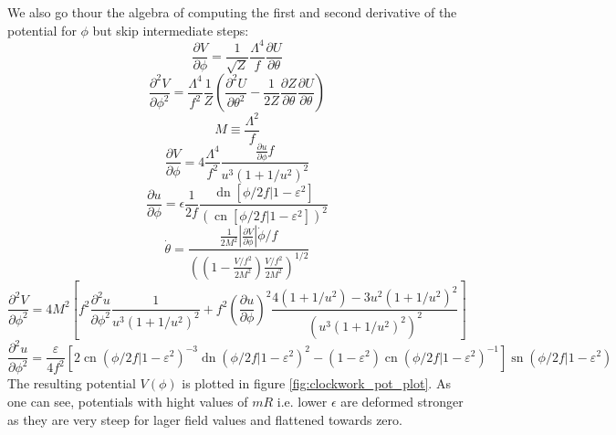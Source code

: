 \documentclass[master,       %
               twoside,        %
               BCOR10mm,       %
               english,ngerman, %
               ]{GAUBM}
\begin{document}
\begin{otherlanguage}{english}
We also go thour the algebra of computing the first and second derivative of the potential for $\phi$ but skip intermediate steps:
\begin{equation}
	\frac{\partial V}{\partial \phi} = \frac{1}{\sqrt{Z}} \frac{\Lambda^4}{f} \frac{\partial U}{\partial \theta}
\end{equation}
\begin{equation}
	\frac{\partial^2 V}{\partial \phi^2} = \frac{\Lambda^4}{f^2} \frac{1}{Z} \left( \frac{\partial^2 U}{\partial \theta^2} - \frac{1}{2 Z} \frac{\partial Z}{\partial \theta} \frac{\partial U}{\partial \theta} \right)
\end{equation}
\begin{equation}
	M \equiv \frac{\Lambda^2}{f}
\end{equation}
\begin{equation}
	\frac{\partial V}{\partial \phi} = 4 \frac{\Lambda^4}{f^2} \frac{\frac{\partial u}{\partial \phi} f}{u^3(1 + 1/u^2)^2}
\end{equation}
\begin{equation}
	\frac{\partial u}{\partial \phi} = \epsilon \frac{1}{2 f} \frac{\operatorname{dn}[\phi/2f|1 - \varepsilon^2]}{(\operatorname{cn}[\phi/2f|1 - \varepsilon^2])^2}
\end{equation}
\begin{equation}
	\dot{\theta} = \frac{\frac{1}{2M^2} \left| \frac{\partial V}{\partial \phi} \right| \dot{\phi} / f}{\left(\left(1 - \frac{V/f^2}{2M^2}\right) \frac{V / f^2}{2 M^2} \right)^{1/2}}
\end{equation}
\begin{equation}
	\frac{\partial^2 V}{\partial \phi^2} = 4 M^2 \left[ f^2 \frac{\partial^2 u}{\partial \phi^2} \frac{1}{u^3(1 + 1/u^2)^2} + f^2 \left( \frac{\partial u}{\partial \phi} \right)^2 \frac{4(1 + 1/u^2) - 3u^2(1 + 1/u^2)^2}{\left( u^3(1 + 1/u^2)^2 \right)^2} \right]
\end{equation}
\begin{equation}
	\frac{\partial^2 u}{\partial \phi^2} = \frac{\varepsilon}{4 f^2} \left[ 2 \operatorname{cn}(\phi/2f|1 - \varepsilon^2)^{-3} \operatorname{dn}(\phi/2f|1 - \varepsilon^2)^2 - (1 - \varepsilon^2) \operatorname{cn}(\phi/2f|1 - \varepsilon^2)^{-1} \right] \operatorname{sn}(\phi/2f|1 - \varepsilon^2)
\end{equation}
The resulting potential $V(\phi)$ is plotted in figure \ref{fig:clockwork_pot_plot}. As one can see, potentials with hight values of $mR$ i.e. lower $\epsilon$ are deformed stronger as they are very steep for lager field values and flattened towards zero. 

\end{otherlanguage}
\end{document}
